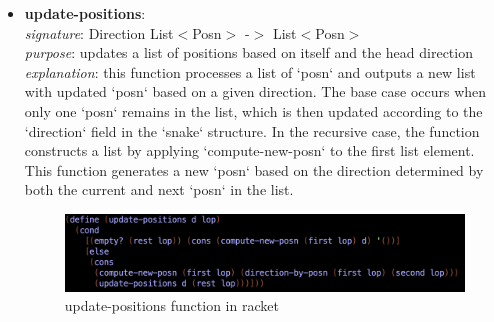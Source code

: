\documentclass{article}
\begin{document}
\begin{itemize}
		\item \textbf{update-positions}: \\
			\emph{signature}: Direction List$<$Posn$>$ -$>$ List$<$Posn$>$ \\
			\emph{purpose}: updates a list of positions based on itself and the head direction \\
			\emph{explanation}: this function processes a list of `posn` and outputs a new list with updated `posn` based on a given direction. The base case occurs when only one `posn` remains in the list, which is then updated according to the `direction` field in the `snake` structure. In the recursive case, the function constructs a list by applying `compute-new-posn` to the first list element. This function generates a new `posn` based on the direction determined by both the current and next `posn` in the list.
			\begin{figure}[h!]
				\centering
				\includegraphics[width=.6\linewidth]{update-positions.png}
				\caption{update-positions function in racket}
			\end{figure}
	\end{itemize}
	
	\pagebreak
	
\end{document}
